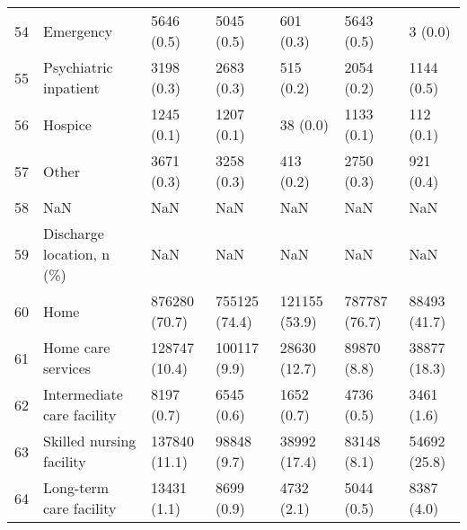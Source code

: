 \begin{tabular}{lllllll}
54 &                                          Emergency &         5646 (0.5) &                    5045 (0.5) &                 601 (0.3) &                     5643 (0.5) &                   3 (0.0) \\
55 &                              Psychiatric inpatient &         3198 (0.3) &                    2683 (0.3) &                 515 (0.2) &                     2054 (0.2) &                1144 (0.5) \\
56 &                                            Hospice &         1245 (0.1) &                    1207 (0.1) &                  38 (0.0) &                     1133 (0.1) &                 112 (0.1) \\
57 &                                              Other &         3671 (0.3) &                    3258 (0.3) &                 413 (0.2) &                     2750 (0.3) &                 921 (0.4) \\
58 &                                                NaN &                NaN &                           NaN &                       NaN &                            NaN &                       NaN \\
59 &                          Discharge location, n (\%) &                NaN &                           NaN &                       NaN &                            NaN &                       NaN \\
60 &                                               Home &      876280 (70.7) &                 755125 (74.4) &             121155 (53.9) &                  787787 (76.7) &              88493 (41.7) \\
61 &                                 Home care services &      128747 (10.4) &                  100117 (9.9) &              28630 (12.7) &                    89870 (8.8) &              38877 (18.3) \\
62 &                         Intermediate care facility &         8197 (0.7) &                    6545 (0.6) &                1652 (0.7) &                     4736 (0.5) &                3461 (1.6) \\
63 &                           Skilled nursing facility &      137840 (11.1) &                   98848 (9.7) &              38992 (17.4) &                    83148 (8.1) &              54692 (25.8) \\
64 &                            Long-term care facility &        13431 (1.1) &                    8699 (0.9) &                4732 (2.1) &                     5044 (0.5) &                8387 (4.0) \\

\end{tabular}
